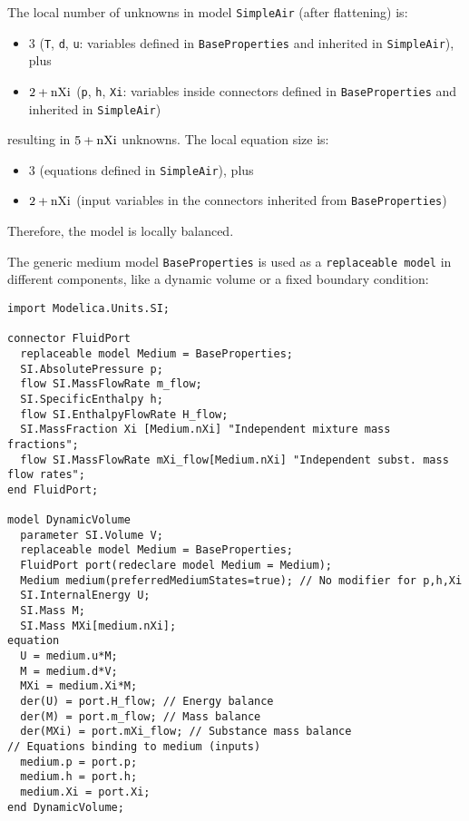 \begin{example}
The local number of unknowns in model \lstinline!SimpleAir! (after flattening) is:
\begin{itemize}
\item
  $3$ (\lstinline!T!, \lstinline!d!, \lstinline!u!: variables defined in
  \lstinline!BaseProperties! and inherited in \lstinline!SimpleAir!), plus
\item
  $2 + \text{\lstinline!nXi!}$ (\lstinline!p!, \lstinline!h!, \lstinline!Xi!: variables inside
  connectors defined in \lstinline!BaseProperties! and inherited in \lstinline!SimpleAir!)
\end{itemize}
resulting in $5 + \text{\lstinline!nXi!}$ unknowns. The local equation size is:
\begin{itemize}
\item
  $3$ (equations defined in \lstinline!SimpleAir!), plus
\item
  $2 + \text{\lstinline!nXi!}$ (input variables in the connectors inherited from \lstinline!BaseProperties!)
\end{itemize}

Therefore, the model is locally balanced.

The generic medium model \lstinline!BaseProperties! is used as a
\lstinline!replaceable model! in different components, like a dynamic
volume or a fixed boundary condition:
\begin{lstlisting}[language=modelica]
import Modelica.Units.SI;

connector FluidPort
  replaceable model Medium = BaseProperties;
  SI.AbsolutePressure p;
  flow SI.MassFlowRate m_flow;
  SI.SpecificEnthalpy h;
  flow SI.EnthalpyFlowRate H_flow;
  SI.MassFraction Xi [Medium.nXi] "Independent mixture mass fractions";
  flow SI.MassFlowRate mXi_flow[Medium.nXi] "Independent subst. mass flow rates";
end FluidPort;

model DynamicVolume
  parameter SI.Volume V;
  replaceable model Medium = BaseProperties;
  FluidPort port(redeclare model Medium = Medium);
  Medium medium(preferredMediumStates=true); // No modifier for p,h,Xi
  SI.InternalEnergy U;
  SI.Mass M;
  SI.Mass MXi[medium.nXi];
equation
  U = medium.u*M;
  M = medium.d*V;
  MXi = medium.Xi*M;
  der(U) = port.H_flow; // Energy balance
  der(M) = port.m_flow; // Mass balance
  der(MXi) = port.mXi_flow; // Substance mass balance
// Equations binding to medium (inputs)
  medium.p = port.p;
  medium.h = port.h;
  medium.Xi = port.Xi;
end DynamicVolume;
\end{lstlisting}


\end{example}
